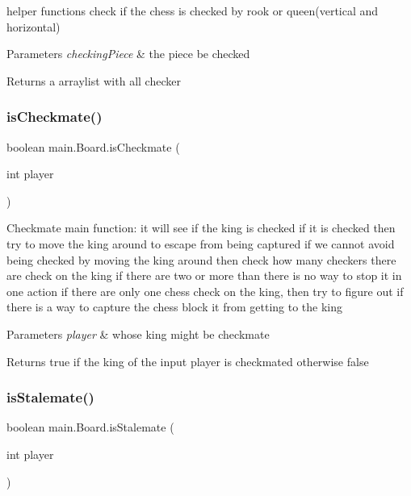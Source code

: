 helper functions check if the chess is checked by rook or queen(vertical and horizontal) 
\begin{DoxyParams}{Parameters}
{\em checking\+Piece} & the piece be checked \\
\hline
\end{DoxyParams}
\begin{DoxyReturn}{Returns}
a arraylist with all checker 
\end{DoxyReturn}
\mbox{\label{classmain_1_1_board_a8b249e2cc598b8255fa95047f918fbf8}} 
\subsubsection{\texorpdfstring{is\+Checkmate()}{isCheckmate()}}
{\footnotesize\ttfamily boolean main.\+Board.\+is\+Checkmate (\begin{DoxyParamCaption}\item[{int}]{player }\end{DoxyParamCaption})\hspace{0.3cm}{\ttfamily [inline]}}

Checkmate main function\+: it will see if the king is checked if it is checked then try to move the king around to escape from being captured if we cannot avoid being checked by moving the king around then check how many checkers there are check on the king if there are two or more than there is no way to stop it in one action if there are only one chess check on the king, then try to figure out if there is a way to capture the chess block it from getting to the king


\begin{DoxyParams}{Parameters}
{\em player} & whose king might be checkmate \\
\hline
\end{DoxyParams}
\begin{DoxyReturn}{Returns}
true if the king of the input player is checkmated otherwise false 
\end{DoxyReturn}
\mbox{\label{classmain_1_1_board_a4d337e9fc0aa574b694f3421d5d076d9}} 
\subsubsection{\texorpdfstring{is\+Stalemate()}{isStalemate()}}
{\footnotesize\ttfamily boolean main.\+Board.\+is\+Stalemate (\begin{DoxyParamCaption}\item[{int}]{player }\end{DoxyParamCaption})\hspace{0.3cm}{\ttfamily [inline]}}

